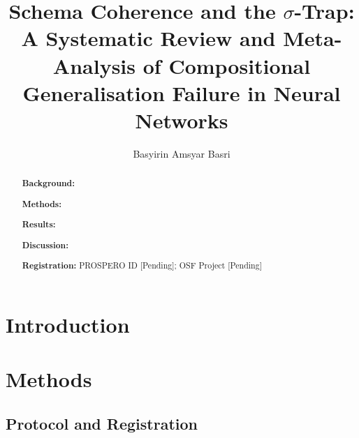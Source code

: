

\title{Schema Coherence and the $\sigma$-Trap: A Systematic Review and Meta-Analysis of Compositional Generalisation Failure in Neural Networks}

\author{Basyirin Amsyar Basri}



\begin{abstract}
\textbf{Background:} 

\textbf{Methods:} 

\textbf{Results:} 

\textbf{Discussion:} 

\textbf{Registration:} PROSPERO ID [Pending]; OSF Project [Pending]
\end{abstract}

\maketitle


\section{Introduction}\label{sec:introduction}


\section{Methods}\label{sec:methods}


\subsection{Protocol and Registration}\label{sec:protocol}

